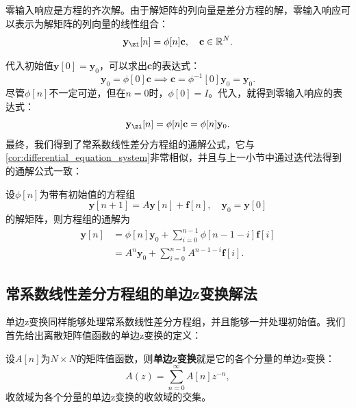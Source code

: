 零输入响应是方程的齐次解。由于解矩阵的列向量是差分方程的解，零输入响应可以表示为解矩阵的列向量的线性组合：
\begin{equation}
    \mathbf{y}_{\zi}[n]=\phi[n]\mathbf{c},\quad \mathbf{c}\in\mathbb{R}^N.\label{eq:diff_sys_zi}
\end{equation}

代入初始值$\mathbf{y}[0]=\mathbf{y}_0$，可以求出$\mathbf{c}$的表达式：
\begin{equation}
    \mathbf{y}_0=\phi[0]\mathbf{c}\implies\mathbf{c}=\phi^{-1}[0]\mathbf{y}_0=\mathbf{y}_0.
\end{equation}
尽管$\phi[n]$不一定可逆，但在$n=0$时，$\phi[0]=I$。代入，就得到零输入响应的表达式：
\begin{equation}
    \mathbf{y}_{\zi}[n]=\phi[n]\mathbf{c}=\phi[n]\mathbf{y}_0.
\end{equation}
最终，我们得到了常系数线性差分方程组的通解公式，它与\cref{cor:differential_equation_system}非常相似，并且与上一小节中通过迭代法得到的通解公式一致：
\begin{theorem}
    设$\phi[n]$为带有初始值的方程组
    \begin{equation}
        \mathbf{y}[n+1]=A\mathbf{y}[n]+\mathbf{f}[n],\quad \mathbf{y}_0=\mathbf{y}[0]
    \end{equation}
    的解矩阵，则方程组的通解为
    \begin{align}
        \mathbf{y}[n]&=\phi[n]\mathbf{y}_0+\sum_{i=0}^{n-1}\phi[n-1-i]\mathbf{f}[i] \nonumber \\
        &=A^n\mathbf{y}_0+\sum_{i=0}^{n-1}A^{n-1-i}\mathbf{f}[i].
    \end{align}
\end{theorem}

\subsection{常系数线性差分方程组的单边z变换解法}\label{sub:difference_equation_system_z}

单边z变换同样能够处理常系数线性差分方程组，并且能够一并处理初始值。我们首先给出离散矩阵值函数的单边z变换的定义：

\begin{definition}[离散矩阵值函数的单边z变换]
    设$A[n]$为$N\times N$的矩阵值函数，则\textbf{单边z变换}就是它的各个分量的单边z变换：
    \begin{equation}
        A(z)=\sum_{n=0}^{\infty}A[n]z^{-n},
    \end{equation}
    收敛域为各个分量的单边z变换的收敛域的交集。
\end{definition}

